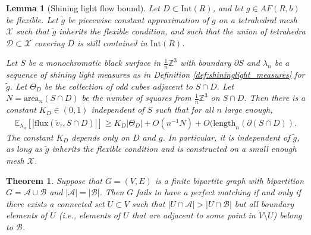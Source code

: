 \documentclass[10pt,a4paper]{amsart}
\newtheorem{thm}{Theorem}
\newtheorem{lemma}{Lemma}
\newcommand{\m}[1]{\mathbb{#1}}
\newcommand{\mc}[1]{\mathcal{#1}}
\begin{document}
\begin{lemma}[Shining light flow bound]\label{lemma:shininglight_flowbound}
    Let $D\subset \text{Int}(R)$, and let $g\in AF(R,b)$ be flexible. Let $\widetilde g$ be piecewise constant approximation of $g$ on a tetrahedral mesh $\mc X$ such that $\widetilde g$ inherits the flexible condition, and such that the union of tetrahedra $\mc D\subset \mc X$ covering $D$ is still contained in $\text{Int}(R)$.
    
     Let $S$ be a monochromatic black surface in $\frac{1}{n}\m Z^3$ with boundary $\partial S$ and $\lambda_n$ be a sequence of shining light measures as in Definition \ref{def:shininglight_measures} for $\widetilde g$. Let $\Theta_D$ be the collection of odd cubes adjacent to $S\cap D$. Let $N = \text{area}_n(S\cap D)$ be the number of squares from $\frac{1}{n} \m Z^3$ on $S\cap D$. Then there is a constant $K_D\in (0,1)$ independent of $S$ such that for all $n$ large enough,
     \begin{align*}
         \m E_{\lambda_n}[|\text{flux}(\widetilde v_\tau,S\cap D)|]\geq K_{D} |\Theta_{D}| +O(n^{-1}N) + O(\text{length}_n(\partial(S\cap D)).
     \end{align*}
     The constant $K_D$ depends only on $D$ and $g$. In particular, it is independent of $\widetilde g$, as long as $\widetilde g$ inherits the flexible condition and is constructed on a small enough mesh $\mc X$. 
\end{lemma}

\begin{thm}\label{thm:halls matching 2}
Suppose that $G = (V,E)$ is a finite bipartite graph with bipartition $G = \mc A\cup \mc B$ and $|\mc A| = |\mc B|$. Then $G$ {\em fails to have} a perfect matching if and only if there exists a connected set $U \subset V$ such that $|U\cap \mc A| > |U \cap \mc B|$ but all boundary elements of $U$ (i.e., elements of $U$ that are adjacent to some point in $V \setminus U$) belong to $\mc B$.
\end{thm}
\end{document}
